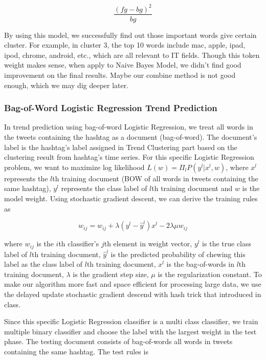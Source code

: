 \documentclass{article}
\begin{document}
\begin{equation} 
\frac{(fg-bg)^2}{bg}
\end{equation}

By using this model, we successfully find out those important words give certain cluster. For example, in cluster 3, the top 10 words include mac, apple, ipad, ipod, chrome, android, etc., which are all relevant to IT fields. Though this token weight makes sense, when apply to Naive Bayes Model, we didn't find good improvement on the final results. Maybe our combine method is not good enough, which we may dig deeper later.

\subsubsection{Bag-of-Word Logistic Regression Trend Prediction}

In trend prediction using bag-of-word Logistic Regression, we treat all words in the tweets containing the hashtag as a document (bag-of-word). The document's label is the hashtag's label assigned in Trend Clustering part based on the clustering result from hashtag's time series. For this specific Logistic Regression problem, we want to maximize log likelihood $L(w)=\Pi_lP(y^l|x^l,w)$, where $x^l$ represents the $l$th training document (BOW of all words in tweets containing the same hashtag), $y^l$ represents the class label of $l$th training document and $w$ is the model weight. Using stochastic gradient descent, we can derive the training rules as 

\begin{equation} 
w_{ij}=w_{ij} + \lambda(y^l - \hat{y}^l) x^l - 2\lambda \mu w_{ij} \label{eq:lrtrain}
\end{equation}

where $w_{ij}$ is the $i$th classifier's $j$th element in weight vector, $y^l$ is the true class label of $l$th training document, $\hat{y}^l$ is the predicted probability of chewing this label as the class label of $l$th training document, $x^l$ is the bag-of-words in $l$th training document,  $\lambda$ is the gradient step size, $\mu$ is the regularization constant. To make our algorithm more fast and space efficient for processing large data, we use the delayed update stochastic gradient descend with hash trick that introduced in class. 

Since this specific Logistic Regression classifier is a multi class classifier, we train multiple binary classifier and choose the label with the largest weight in the test phase. The testing document consists of bag-of-words all words in tweets containing the same hashtag. The test rules is    
\end{document}
